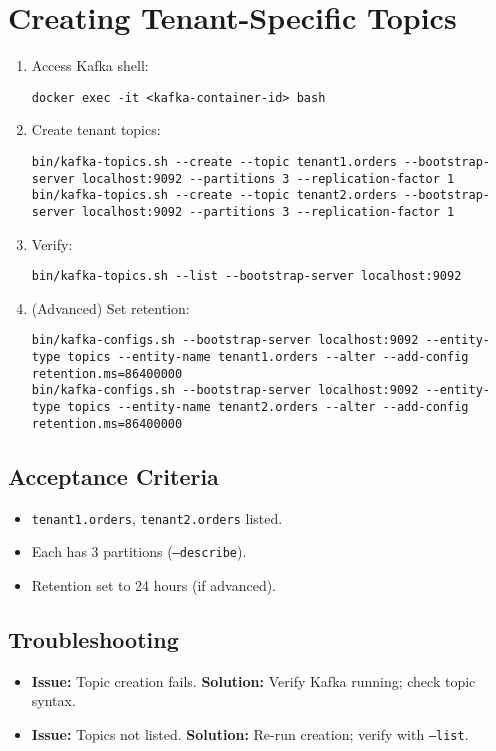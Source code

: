 \documentclass[12pt,a4paper]{report}
\begin{document}
\section{Creating Tenant-Specific Topics}
\begin{enumerate}
    \item Access Kafka shell:
    \begin{lstlisting}
docker exec -it <kafka-container-id> bash
    \end{lstlisting}
    \item Create tenant topics:
    \begin{lstlisting}
bin/kafka-topics.sh --create --topic tenant1.orders --bootstrap-server localhost:9092 --partitions 3 --replication-factor 1
bin/kafka-topics.sh --create --topic tenant2.orders --bootstrap-server localhost:9092 --partitions 3 --replication-factor 1
    \end{lstlisting}
    \item Verify:
    \begin{lstlisting}
bin/kafka-topics.sh --list --bootstrap-server localhost:9092
    \end{lstlisting}
    \item (Advanced) Set retention:
    \begin{lstlisting}
bin/kafka-configs.sh --bootstrap-server localhost:9092 --entity-type topics --entity-name tenant1.orders --alter --add-config retention.ms=86400000
bin/kafka-configs.sh --bootstrap-server localhost:9092 --entity-type topics --entity-name tenant2.orders --alter --add-config retention.ms=86400000
    \end{lstlisting}
\end{enumerate}

\subsection{Acceptance Criteria}
\begin{itemize}
    \item \texttt{tenant1.orders}, \texttt{tenant2.orders} listed.
    \item Each has 3 partitions (\texttt{--describe}).
    \item Retention set to 24 hours (if advanced).
\end{itemize}

\subsection{Troubleshooting}
\begin{itemize}
    \item \textbf{Issue:} Topic creation fails.
      \textbf{Solution:} Verify Kafka running; check topic syntax.
    \item \textbf{Issue:} Topics not listed.
      \textbf{Solution:} Re-run creation; verify with \texttt{--list}.
\end{itemize}
\end{document}
